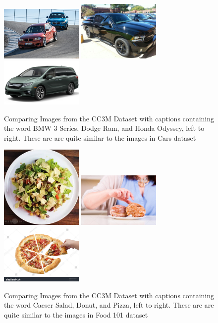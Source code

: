 \documentclass{article} %
\theoremstyle{plain}
\theoremstyle{definition}
\theoremstyle{remark}
\begin{document}
\begin{figure}[!h]
    \centering\includegraphics[width=4cm]{../images/bmw.png} \hfill
    \includegraphics[width=4cm]{../images/dodge.png} \hfill
    \includegraphics[width=4cm]{../images/honda.png}
    \caption{Comparing Images from the CC3M Dataset with captions containing the word BMW 3 Series, Dodge Ram, and Honda Odyssey, left to right. These are are quite similar to the images in Cars dataset}
    \label{car}
\end{figure}

\begin{figure}[!h]
    \centering\includegraphics[width=4cm]{../images/caeser.png} \hfill
    \includegraphics[width=4cm]{../images/donuts.png} \hfill
    \includegraphics[width=4cm]{../images/pizza.png}
    \caption{Comparing Images from the CC3M Dataset with captions containing the word Caeser Salad, Donut, and Pizza, left to right. These are are quite similar to the images in Food 101 dataset}
    \label{food}
\end{figure}

\label{clipn}
\end{document}
